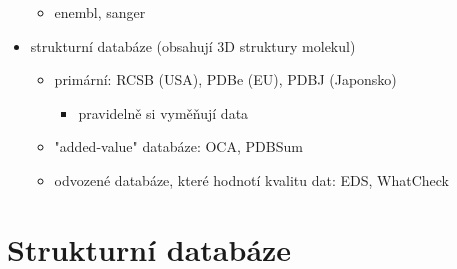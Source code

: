 \documentclass[DIV=8]{scrreprt}
\begin{document}
\begin{itemize}[nosep]
\begin{itemize}[nosep]
    \item enembl, sanger
\end{itemize}

    \item strukturní databáze (obsahují 3D struktury molekul)
\begin{itemize}[nosep]
    \item primární: RCSB (USA), PDBe (EU), PDBJ (Japonsko)
\begin{itemize}[nosep]
    \item pravidelně si vyměňují data
\end{itemize}

    \item "added-value" databáze: OCA, PDBSum
    \item odvozené databáze, které hodnotí kvalitu dat: EDS, WhatCheck
\end{itemize}

\end{itemize}



\section{Strukturní databáze} \label{Strukturní databáze}
\end{document}
